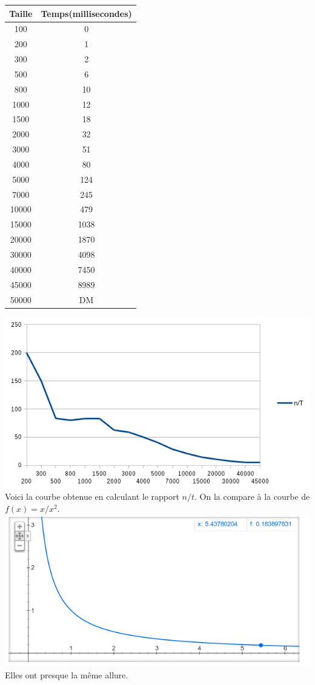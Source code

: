 \documentclass[a4paper, 12pt]{article}
\begin{document}
\begin{minipage}[c]{0.4\linewidth}
\begin{tabular}{|c|c|}
\hline
Taille & Temps(millisecondes) \\
\hline
100	& 0\\
200	& 1\\
300	& 2\\
500 & 6\\
800& 	10\\
1000& 	12\\
1500& 	18\\
2000& 	32\\
3000& 	51\\
4000& 	80\\
5000& 	124\\
7000& 	245\\
10000& 	479\\
15000& 	1038\\
20000& 	1870\\
30000& 	4098\\
40000& 	7450\\
45000& 	8989\\
50000& 	DM\\
\hline
\end{tabular}
\end{minipage}\hfill
\begin{minipage}[c]{0.6\linewidth}
	\includegraphics[scale=0.6]{curve_algo_2.png}
	 	Voici la courbe obtenue en calculant le rapport $n/t$.
	 	On la compare à la courbe de $f(x)=x/x^2$.
	\includegraphics[scale=0.4]{x_x2.png}
	Elles ont presque la même allure.
\end{minipage}\hfill
\end{document}
